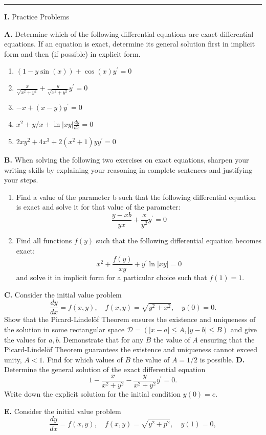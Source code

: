 \documentclass[11pt,a4paper,twoside]{article}
\begin{document}
	\rule{\textwidth}{0.4pt}
	\newpage
	\textbf{I.} Practice Problems\par
	\textbf{A.} Determine which of the following differential equations are exact differential equations. If an equation is exact, determine its general solution first in implicit form and then (if possible) in explicit form.
	\begin{enumerate}[\bfseries 1)]
		\item $(1-y\sin(x)) + \cos(x)y^\prime = 0$
		\item $\frac{x}{\sqrt{x^2+y^2}} + \frac{y}{\sqrt{x^2+y^2}}y^\prime = 0$
		\item $-x + (x-y)y^\prime = 0$
		\item $x^2+y/x + \ln|xy|\frac{dy}{dx} = 0$
		\item $2xy^2 + 4x^3 + 2(x^2+1)yy^\prime = 0$ 
	\end{enumerate}
	\textbf{B.} When solving the following two exercises on exact equations, sharpen your writing skills by explaining your reasoning in complete sentences and justifying your steps.
	\begin{enumerate}[\bfseries 1)]
		\item Find a value of the parameter b such that the following differential equation is exact and solve it for that value of the parameter:
		$$
		\frac{y-xb}{yx} + \frac{x}{y^2}y^\prime = 0
		$$
		\item Find all functions $f(y)$ such that the following differential equation becomes exact:
		$$
		x^2+\frac{f(y)}{xy}+y^\prime \ln|xy| = 0
		$$
		and solve it in implicit form for a particular choice such that $f(1) = 1$.
	\end{enumerate}
	\textbf{C.} Consider the initial value problem
	$$
	\frac{dy}{dx} = f(x,y), \quad f(x,y)=\sqrt{y^2+x^2}, \quad y(0)=0.
	$$
	Show that the Picard-Lindel\"{o}f Theorem ensures the existence and uniqueness of the solution in some rectangular space $\mathcal{D} = (|x − a| \leq A, |y − b| \leq B)$ and give the values for $a, b$. Demonstrate that for any $B$ the value of $A$ ensuring that the Picard-Lindel\"{o}f Theorem guarantees the existence and uniqueness cannot exceed unity, $A < 1$. Find for which values of $B$ the value of $A = 1/2$ is possible.
	\textbf{D.} Determine the general solution of the exact differential equation
	$$
	1-\frac{x}{x^2+y^2}-\frac{y}{x^2+y^2}y^\prime = 0.
	$$
	Write down the explicit solution for the initial condition $y(0) = e$.\par
	\textbf{E.} Consider the initial value problem
	$$
	\frac{dy}{dx} = f(x,y),\quad f(x,y) = \sqrt{y^2+p^2},\quad y(1) = 0,
	$$
\end{document}
